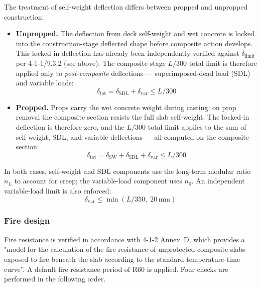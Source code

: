 The treatment of self-weight deflection differs between propped and unpropped construction:

\begin{itemize}
    \item \textbf{Unpropped.} The deflection from deck self-weight and wet concrete is locked into the construction-stage deflected shape before composite action develops. This locked-in deflection has already been independently verified against $\delta_\mathrm{limit}$ per 4-1-1/9.3.2 (see above). The composite-stage $L/300$ total limit is therefore applied only to \emph{post-composite} deflections --- superimposed-dead load (SDL) and variable loads:
\begin{equation}
    \delta_\mathrm{tot} = \delta_\mathrm{SDL} + \delta_\mathrm{var} \le L/300
    \label{eq:delta_tot_unpropped}
\end{equation}

    \item \textbf{Propped.} Props carry the wet concrete weight during casting; on prop removal the composite section resists the full slab self-weight. The locked-in deflection is therefore zero, and the $L/300$ total limit applies to the sum of self-weight, SDL, and variable deflections --- all computed on the composite section:
\begin{equation}
    \delta_\mathrm{tot} = \delta_\mathrm{SW} + \delta_\mathrm{SDL} + \delta_\mathrm{var} \le L/300
    \label{eq:delta_tot_propped}
\end{equation}
\end{itemize}

In both cases, self-weight and SDL components use the long-term modular ratio $n_L$ to account for creep; the variable-load component uses $n_0$. An independent variable-load limit is also enforced:
\begin{equation}
    \delta_\mathrm{var} \le \min(L/350,\;20\,\mathrm{mm})
\end{equation}

\subsubsection*{Fire design}
\label{sec:fire}

Fire resistance is verified in accordance with 4-1-2 Annex~D, which provides a "model for the calculation of the fire resistance of unprotected composite slabs exposed to fire beneath the slab according to the standard temperature-time curve”. A default fire resistance period of R60 is applied. Four checks are performed in the following order.

